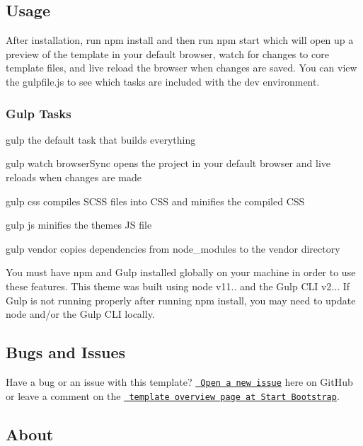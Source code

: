 \subsection*{Usage}

After installation, run {\ttfamily npm install} and then run {\ttfamily npm start} which will open up a preview of the template in your default browser, watch for changes to core template files, and live reload the browser when changes are saved. You can view the {\ttfamily gulpfile.\+js} to see which tasks are included with the dev environment.

\subsubsection*{Gulp Tasks}


\begin{DoxyItemize}
\item {\ttfamily gulp} the default task that builds everything
\item {\ttfamily gulp watch} browser\+Sync opens the project in your default browser and live reloads when changes are made
\item {\ttfamily gulp css} compiles S\+C\+SS files into C\+SS and minifies the compiled C\+SS
\item {\ttfamily gulp js} minifies the themes JS file
\item {\ttfamily gulp vendor} copies dependencies from node\+\_\+modules to the vendor directory
\end{DoxyItemize}

You must have npm and Gulp installed globally on your machine in order to use these features. This theme was built using node v11.. and the Gulp C\+LI v2... If Gulp is not running properly after running {\ttfamily npm install}, you may need to update node and/or the Gulp C\+LI locally.

\subsection*{Bugs and Issues}

Have a bug or an issue with this template? \href{https://github.com/BlackrockDigital/startbootstrap-sb-admin-2/issues}{\texttt{ Open a new issue}} here on Git\+Hub or leave a comment on the \href{http://startbootstrap.com/template-overviews/sb-admin-2/}{\texttt{ template overview page at Start Bootstrap}}.

\subsection*{About}

